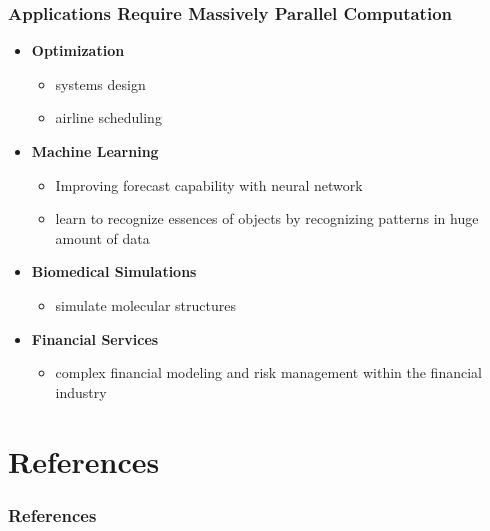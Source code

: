 \documentclass[xcolor=x11names,table]{beamer}
\begin{document}
	\begin{frame}[allowframebreaks]
		\frametitle{Applications Require Massively Parallel Computation}
		\begin{itemize}
			\item \textbf{Optimization}
			\begin{itemize}
				\item systems design
				\item airline scheduling
			\end{itemize}
			
			\item \textbf{Machine Learning}
			\begin{itemize}
				\item Improving forecast capability with neural network
				\item learn to recognize essences of objects by recognizing patterns in huge amount of data
			\end{itemize}
			
			\item \textbf{Biomedical Simulations}
			\begin{itemize}
				\item simulate molecular structures
			\end{itemize}
			
			\item \textbf{Financial Services}
			\begin{itemize}
				\item complex financial modeling and risk management within the financial industry
			\end{itemize}
		\end{itemize}
	\end{frame}
	
	\section{References}
	
	\begin{frame}
		\frametitle{References}
		\centering
		\href{https://www.youtube.com/watch?v=dx98pqJvZVk}{} \\
		\href{https://www.youtube.com/watch?v=OWJCfOvochA}{} \\
		\href{https://www.youtube.com/watch?v=zhQItO6_WoI}{} \\
		\href{https://www.explainingcomputers.com/quantum.html}{} \\
	\end{frame}
\end{document}
